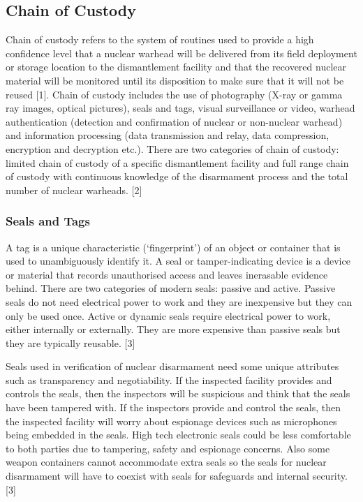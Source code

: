 \documentclass[twocolumn,a4paper]{article}
\begin{document}
\subsection{Chain of Custody}
Chain of custody refers to the system of routines used to provide a high confidence level that a
nuclear warhead will be delivered from its field deployment or storage location to the
dismantlement facility and that the recovered nuclear material will be monitored until its disposition
to make sure that it will not be reused [1]. Chain of custody includes the use of photography (X-ray
or gamma ray images, optical pictures), seals and tags, visual surveillance or video, warhead
authentication (detection and confirmation of nuclear or non-nuclear warhead) and information
processing (data transmission and relay, data compression, encryption and decryption etc.). There
are two categories of chain of custody: limited chain of custody of a specific dismantlement facility
and full range chain of custody with continuous knowledge of the disarmament process and the total
number of nuclear warheads. [2]

\subsubsection{Seals and Tags}
A tag is a unique characteristic (`fingerprint') of an object or container that is used to unambiguously
identify it. A seal or tamper-indicating device is a device or material that records unauthorised access
and leaves inerasable evidence behind. There are two categories of modern seals: passive and
active. Passive seals do not need electrical power to work and they are inexpensive but they can only
be used once. Active or dynamic seals require electrical power to work, either internally or
externally. They are more expensive than passive seals but they are typically reusable. [3]

Seals used in verification of nuclear disarmament need some unique attributes such as transparency
and negotiability. If the inspected facility provides and controls the seals, then the inspectors will be
suspicious and think that the seals have been tampered with. If the inspectors provide and control
the seals, then the inspected facility will worry about espionage devices such as microphones being
embedded in the seals. High tech electronic seals could be less comfortable to both parties due to
tampering, safety and espionage concerns. Also some weapon containers cannot accommodate
extra seals so the seals for nuclear disarmament will have to coexist with seals for safeguards and
internal security. [3]
\end{document}

